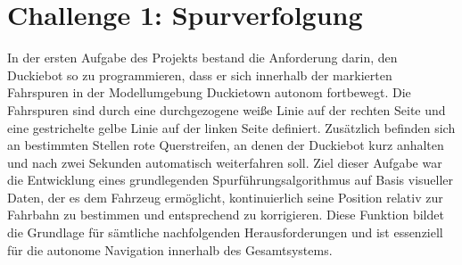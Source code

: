 \chapter{Challenge 1: Spurverfolgung}
\label{ch:Challenge_1}
In der ersten Aufgabe des Projekts bestand die Anforderung darin, den Duckiebot so zu programmieren, 
dass er sich innerhalb der markierten Fahrspuren in der Modellumgebung Duckietown autonom fortbewegt. 
Die Fahrspuren sind durch eine durchgezogene weiße Linie auf der rechten Seite und eine gestrichelte gelbe 
Linie auf der linken Seite definiert. Zusätzlich befinden sich an bestimmten Stellen rote Querstreifen, an 
denen der Duckiebot kurz anhalten und nach zwei Sekunden automatisch weiterfahren soll. Ziel dieser Aufgabe 
war die Entwicklung eines grundlegenden Spurführungsalgorithmus auf Basis visueller Daten, der es dem Fahrzeug 
ermöglicht, kontinuierlich seine Position relativ zur Fahrbahn zu bestimmen und entsprechend zu korrigieren. 
Diese Funktion bildet die Grundlage für sämtliche nachfolgenden Herausforderungen und ist essenziell für 
die autonome Navigation innerhalb des Gesamtsystems. 